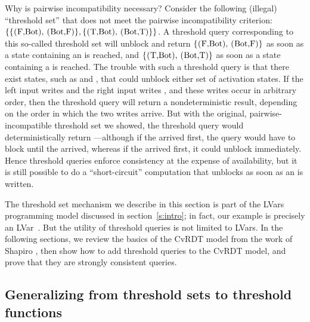 Why is pairwise incompatibility necessary?  Consider the following
(illegal) ``threshold set'' that does not meet the pairwise
incompatibility criterion:
$ \{ \{ \textrm{\il{(F,Bot)}, \il{(Bot,F)}} \},  \{ \textrm{\il{(T,Bot)}, \il{(Bot,T)}} \} \} $.
A threshold query corresponding to this so-called threshold set will
unblock and return $\{ \textrm{\il{(F,Bot)}, \il{(Bot,F)}} \}$
as soon as a state containing an
 is reached, and $\{ \textrm{\il{(T,Bot)}, \il{(Bot,T)}} \}$
as soon as a state
containing a  is reached.  The trouble with such a threshold
query is that there exist states, such as  and ,
that could unblock either set of activation states.  If the left input
writes  and the right input writes , and these writes
occur in arbitrary order, then the threshold query will return a
nondeterministic result, depending on the order in which the two
writes arrive.  But with the original, pairwise-incompatible threshold
set we showed, the threshold query would deterministically return
---although if the  arrived first, the query would
have to block until the  arrived, whereas if the  arrived
first, it could unblock immediately.  Hence threshold queries enforce
consistency at the expense of availability, but it is still possible
to do a ``short-circuit'' computation that unblocks as soon as an
 is written.

The threshold set mechanism we describe in this section is 
part of the LVars programming model discussed in
section~\ref{s:intro}; in fact, our  example is precisely an
LVar~\cite{effectzoo}.  But the utility of threshold queries
is not limited to LVars.  In
the following sections, we review the basics of the CvRDT model from the work of
Shapiro \etal, then show how to add threshold queries to the CvRDT
model, and prove that they are strongly
consistent queries.

\subsection{Generalizing from threshold sets to threshold functions}



